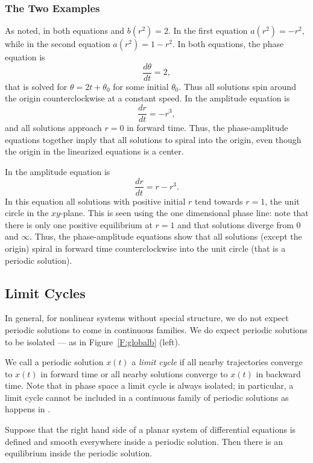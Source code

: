 \documentclass{ximera}
\begin{document}
\subsubsection*{The Two Examples}

As noted, in both equations  and 
$b(r^2) = 2$.  In the first equation $a(r^2) = -r^2$, while in
the second equation $a(r^2)=1-r^2$.  In both equations, the
phase equation is
\[
\frac{d\theta}{dt} = 2,
\]
that is solved for $\theta = 2t + \theta_0$ for some initial
$\theta_0$.  Thus all solutions spin around the origin
counterclockwise at a constant speed.  In 
the amplitude equation is
\[
\frac{dr}{dt} = -r^3,
\]
and all solutions approach $r=0$ in forward time.  Thus, the 
phase-amplitude equations together imply that all solutions 
to  spiral into the origin, even though the 
origin in the linearized equations is a center. 

In  the amplitude equation is 
\[
\frac{dr}{dt} = r-r^3.
\]
In this equation all solutions with positive initial $r$ tend towards 
$r=1$, the unit circle in the $xy$-plane.  This is seen using the one
dimensional phase line: note that there is only one positive equilibrium at 
$r=1$ and that solutions diverge from $0$ and $\infty$.  Thus, the 
phase-amplitude equations show that 
all solutions (except the origin) spiral in forward time counterclockwise 
into the unit circle (that is a periodic solution).

\subsection*{Limit Cycles}

In general, for nonlinear systems without special structure, 
we do not expect periodic solutions to come in continuous families.
We do expect periodic solutions to be isolated --- as in 
Figure~\ref{F:globalb} (left).  

We call a periodic solution $x(t)$ a {\em limit cycle\/} if all 
nearby trajectories converge to $x(t)$ in forward time or all nearby
solutions converge to $x(t)$ in backward time.  Note that in phase 
space a limit cycle is always isolated; in particular, a limit cycle 
cannot be included in a continuous family of periodic solutions as 
happens in .

\begin{thm} \label{T:PB}
Suppose that the right hand side of a planar system of differential 
equations is defined and smooth everywhere inside a periodic solution.  
Then there is an equilibrium inside the periodic solution.
\end{thm} 
\end{document}
